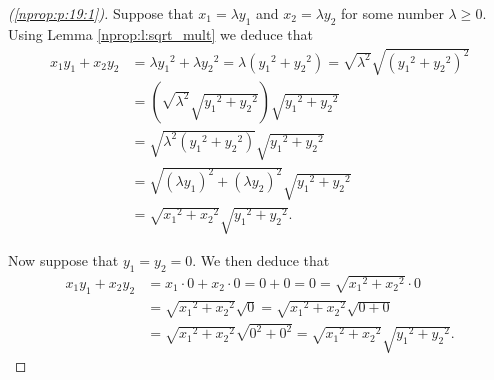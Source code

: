 \setcounter{equation}{0}
\begin{proof}[(\ref{nprop:p:19:1})]
	Suppose that $x_1 = \lambda y_1$ and $x_2 = \lambda y_2$ for some number $\lambda \geq 0$. Using Lemma \ref{nprop:l:sqrt_mult} we deduce that
	\begin{align*}
		x_1 y_1 + x_2 y_2 & = \lambda y_1{ }^2 + \lambda y_2{ }^2 = \lambda (y_1{ }^2 + y_2{ }^2) = \sqrt{\lambda^2} \sqrt{(y_1{ }^2 + y_2{ }^2)^2} \\
		                  & = \left( \sqrt{\lambda^2} \sqrt{y_1{ }^2 + y_2{ }^2} \right) \sqrt{y_1{ }^2 + y_2{ }^2}                                 \\
		                  & = \sqrt{\lambda^2 (y_1{ }^2 + y_2{ }^2)} \sqrt{y_1{ }^2 + y_2{ }^2}                                                     \\
		                  & = \sqrt{(\lambda y_1)^2 + (\lambda y_2)^2} \sqrt{y_1{ }^2 + y_2{ }^2}                                                   \\
		                  & = \sqrt{x_1{ }^2 + x_2{ }^2} \sqrt{y_1{ }^2 + y_2{ }^2}.
	\end{align*}

	Now suppose that $y_1 = y_2 = 0$. We then deduce that
	\begin{align}
		\tag{*}
		x_1 y_1 + x_2 y_2 & = x_1 \cdot 0 + x_2 \cdot 0 = 0 + 0 = 0 = \sqrt{x_1{ }^2 + x_2{ }^2} \cdot 0 \nonumber                                         \\
		                  & = \sqrt{x_1{ }^2 + x_2{ }^2} \sqrt{0} = \sqrt{x_1{ }^2 + x_2{ }^2} \sqrt{0 + 0} \nonumber                                      \\
		                  & = \sqrt{x_1{ }^2 + x_2{ }^2} \sqrt{0^2 + 0^2} = \sqrt{x_1{ }^2 + x_2{ }^2} \sqrt{y_1{ }^2 + y_2{ }^2}. \label{nprop:p:19:eq:1}
	\end{align}


\end{proof}
